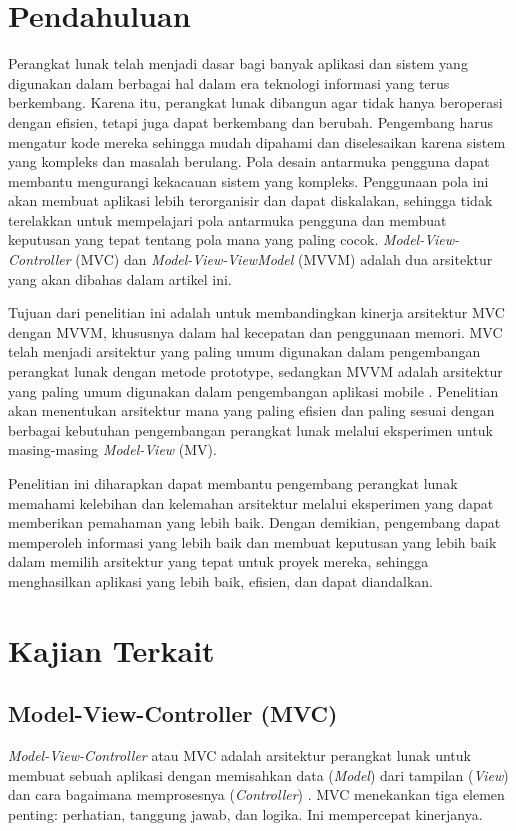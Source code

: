 \documentclass[conference]{IEEEtran}
\begin{document}
	\section{Pendahuluan}
	Perangkat lunak telah menjadi dasar bagi banyak aplikasi dan sistem yang digunakan dalam berbagai hal dalam era teknologi informasi yang terus berkembang. Karena itu, perangkat lunak dibangun agar tidak hanya beroperasi dengan efisien, tetapi juga dapat berkembang dan berubah. Pengembang harus mengatur kode mereka sehingga mudah dipahami dan diselesaikan karena sistem yang kompleks dan masalah berulang. Pola desain antarmuka pengguna dapat membantu mengurangi kekacauan sistem yang kompleks. Penggunaan pola ini akan membuat aplikasi lebih terorganisir dan dapat diskalakan, sehingga tidak terelakkan untuk mempelajari pola antarmuka pengguna dan membuat keputusan yang tepat tentang pola mana yang paling cocok\cite{Perbandingan4}. \textit{Model-View-Controller} (MVC) dan \textit{Model-View-ViewModel} (MVVM) adalah dua arsitektur yang akan dibahas dalam artikel ini.
	
	Tujuan dari penelitian ini adalah untuk membandingkan kinerja arsitektur MVC dengan MVVM, khususnya dalam hal kecepatan dan penggunaan memori. MVC telah menjadi arsitektur yang paling umum digunakan dalam pengembangan perangkat lunak dengan metode prototype, sedangkan MVVM adalah arsitektur yang paling umum digunakan dalam pengembangan aplikasi mobile \cite{Perbandingan4}. Penelitian akan menentukan arsitektur mana yang paling efisien dan paling sesuai dengan berbagai kebutuhan pengembangan perangkat lunak melalui eksperimen untuk masing-masing \textit{Model-View} (MV). 
	
	Penelitian ini diharapkan dapat membantu pengembang perangkat lunak memahami kelebihan dan kelemahan arsitektur melalui eksperimen yang dapat memberikan pemahaman yang lebih baik. Dengan demikian, pengembang dapat memperoleh informasi yang lebih baik dan membuat keputusan yang lebih baik dalam memilih arsitektur yang tepat untuk proyek mereka, sehingga menghasilkan aplikasi yang lebih baik, efisien, dan dapat diandalkan.
	
	
	\section{Kajian Terkait}
	
	\subsection{Model-View-Controller (MVC)}
	\textit{Model-View-Controller} atau MVC adalah arsitektur perangkat lunak untuk membuat sebuah aplikasi dengan memisahkan data (\textit{Model}) dari tampilan (\textit{View}) dan cara bagaimana memprosesnya (\textit{Controller})\cite{Perbandingan4} \cite{MVC} . MVC menekankan tiga elemen penting: perhatian, tanggung jawab, dan logika. Ini mempercepat kinerjanya.
	
\end{document}
